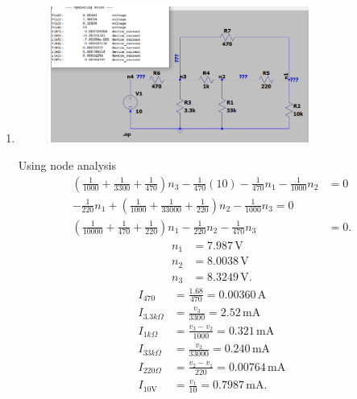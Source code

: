 \documentclass{zc-ust-hw}
\begin{document}
\begin{enumerate}
  \item
    \begin{figure}[htpb]
      \centering
      \includegraphics[width=0.8\textwidth]{figures/2.png}
      \caption{}
      \label{fig:figures-2-png}
    \end{figure}
    \begin{sol}
      Using node analysis
      \begin{align}
        \left( \frac{1}{1000}+\frac{1}{3300}+\frac{1}{470} \right) n_3 - \frac{1}{470}(10)-\frac{1}{470}n_1 - \frac{1}{1000}n_2 &= 0 \\
        -\frac{1}{220}n_1 + \left( \frac{1}{1000}+\frac{1}{33000}+\frac{1}{220} \right) n_2 - \frac{1}{1000}n_3=0 \\
        \left( \frac{1}{10000}+\frac{1}{470}+\frac{1}{220} \right) n_1 - \frac{1}{220} n_2 - \frac{1}{470}n_3 &= 0
      .\end{align}
      \begin{align}
        n_1 &= 7.987\,\mathrm{V}\\
        n_2 &= 8.0038\,\mathrm{V}\\
        n_3 &= 8.3249\,\mathrm{V}
      .\end{align}
      \begin{align}
        I_{470} &= \frac{1.68}{470} = 0.00360\,\mathrm{A}\\
        I_{3.3k\Omega} &= \frac{v_3}{3300} = 2.52\,\mathrm{mA}\\
        I_{1k\Omega} &= \frac{v_3-v_2}{1000} = 0.321\,\mathrm{mA} \\
        I_{33k\Omega} &= \frac{v_2}{33000} = 0.240\,\mathrm{mA} \\
        I_{220\Omega} &= \frac{v_2-v_1}{220} = 0.00764\,\mathrm{mA}\\
        I_{10\mathrm{V}} &= \frac{v_1}{10} = 0.7987\,\mathrm{mA}
      .\end{align}
    \end{sol}

\end{enumerate}
\end{document}
